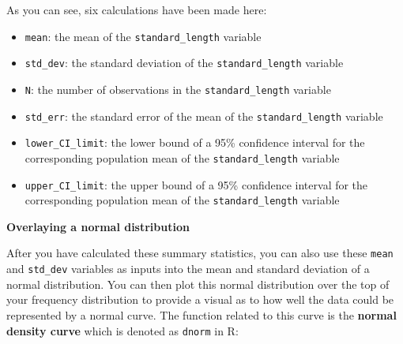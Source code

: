 \documentclass[twoside, 12pt]{article}
\newenvironment{Shaded}{\begin{snugshade}}{\end{snugshade}}
\newcommand{\KeywordTok}[1]{\textcolor[rgb]{0.13,0.29,0.53}{\textbf{{#1}}}}
\newcommand{\DataTypeTok}[1]{\textcolor[rgb]{0.13,0.29,0.53}{{#1}}}
\newcommand{\FloatTok}[1]{\textcolor[rgb]{0.00,0.00,0.81}{{#1}}}
\newcommand{\StringTok}[1]{\textcolor[rgb]{0.31,0.60,0.02}{{#1}}}
\newcommand{\NormalTok}[1]{{#1}}
\providecommand{\tightlist}{%
  \setlength{\itemsep}{0pt}\setlength{\parskip}{0pt}}
\begin{document}
As you can see, six calculations have been made here:

\begin{itemize}
\tightlist
\item
  \texttt{mean}: the mean of the \texttt{standard\_length} variable
\item
  \texttt{std\_dev}: the standard deviation of the
  \texttt{standard\_length} variable
\item
  \texttt{N}: the number of observations in the
  \texttt{standard\_length} variable
\item
  \texttt{std\_err}: the standard error of the mean of the
  \texttt{standard\_length} variable
\item
  \texttt{lower\_CI\_limit}: the lower bound of a 95\% confidence
  interval for the corresponding population mean of the
  \texttt{standard\_length} variable
\item
  \texttt{upper\_CI\_limit}: the upper bound of a 95\% confidence
  interval for the corresponding population mean of the
  \texttt{standard\_length} variable
\end{itemize}

\medskip

\textbf{Overlaying a normal distribution}

After you have calculated these summary statistics, you can also use
these \texttt{mean} and \texttt{std\_dev} variables as inputs into the
mean and standard deviation of a normal distribution. You can then plot
this normal distribution over the top of your frequency distribution to
provide a visual as to how well the data could be represented by a
normal curve. The function related to this curve is the \textbf{normal
density curve} which is denoted as \texttt{dnorm} in R:

\begin{Shaded}
\end{Shaded}
\end{document}
